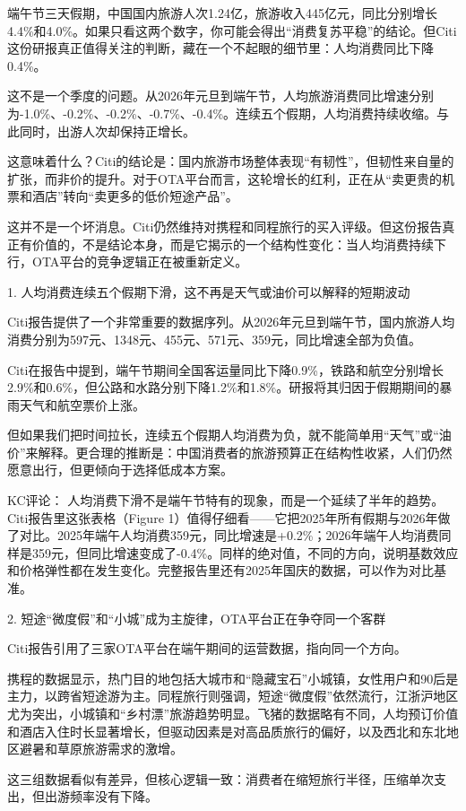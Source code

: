 \documentclass[11pt]{ctexart}
\begin{document}
端午节三天假期，中国国内旅游人次1.24亿，旅游收入445亿元，同比分别增长4.4\%和4.0\%。如果只看这两个数字，你可能会得出“消费复苏平稳”的结论。但Citi这份研报真正值得关注的判断，藏在一个不起眼的细节里：人均消费同比下降0.4\%。

这不是一个季度的问题。从2026年元旦到端午节，人均旅游消费同比增速分别为-1.0\%、-0.2\%、-0.2\%、-0.7\%、-0.4\%。连续五个假期，人均消费持续收缩。与此同时，出游人次却保持正增长。

这意味着什么？Citi的结论是：国内旅游市场整体表现“有韧性”，但韧性来自量的扩张，而非价的提升。对于OTA平台而言，这轮增长的红利，正在从“卖更贵的机票和酒店”转向“卖更多的低价短途产品”。

这并不是一个坏消息。Citi仍然维持对携程和同程旅行的买入评级。但这份报告真正有价值的，不是结论本身，而是它揭示的一个结构性变化：当人均消费持续下行，OTA平台的竞争逻辑正在被重新定义。

1. 人均消费连续五个假期下滑，这不再是天气或油价可以解释的短期波动

Citi报告提供了一个非常重要的数据序列。从2026年元旦到端午节，国内旅游人均消费分别为597元、1348元、455元、571元、359元，同比增速全部为负值。

Citi在报告中提到，端午节期间全国客运量同比下降0.9\%，铁路和航空分别增长2.9\%和0.6\%，但公路和水路分别下降1.2\%和1.8\%。研报将其归因于假期期间的暴雨天气和航空票价上涨。

但如果我们把时间拉长，连续五个假期人均消费为负，就不能简单用“天气”或“油价”来解释。更合理的推断是：中国消费者的旅游预算正在结构性收紧，人们仍然愿意出行，但更倾向于选择低成本方案。

KC评论： 人均消费下滑不是端午节特有的现象，而是一个延续了半年的趋势。Citi报告里这张表格（Figure 1）值得仔细看——它把2025年所有假期与2026年做了对比。2025年端午人均消费359元，同比增速是+0.2\%；2026年端午人均消费同样是359元，但同比增速变成了-0.4\%。同样的绝对值，不同的方向，说明基数效应和价格弹性都在发生变化。完整报告里还有2025年国庆的数据，可以作为对比基准。

2. 短途“微度假”和“小城”成为主旋律，OTA平台正在争夺同一个客群

Citi报告引用了三家OTA平台在端午期间的运营数据，指向同一个方向。

携程的数据显示，热门目的地包括大城市和“隐藏宝石”小城镇，女性用户和90后是主力，以跨省短途游为主。同程旅行则强调，短途“微度假”依然流行，江浙沪地区尤为突出，小城镇和“乡村漂”旅游趋势明显。飞猪的数据略有不同，人均预订价值和酒店入住时长显著增长，但驱动因素是对高品质旅行的偏好，以及西北和东北地区避暑和草原旅游需求的激增。

这三组数据看似有差异，但核心逻辑一致：消费者在缩短旅行半径，压缩单次支出，但出游频率没有下降。
\end{document}
